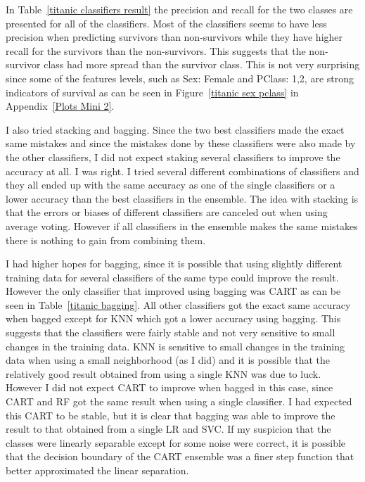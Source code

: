 \documentclass[11pt,twoside,swedish]{article}
\begin{document}
In Table~\ref{titanic classifiers result} the precision and recall for
the two classes are presented for all of the classifiers. Most of the
classifiers seems to have less precision when predicting survivors
than non-survivors while they have higher recall for the survivors
than the non-survivors. This suggests that the non-survivor class had
more spread than the survivor class. This is not very surprising since
some of the features levels, such as Sex: Female and PClass: 1,2, are
strong indicators of survival as can be seen in Figure~\ref{titanic
  sex pclass} in Appendix~\ref{Plots Mini 2}. 

I also tried stacking and bagging. Since the two best classifiers made
the exact same mistakes and since the mistakes done by these
classifiers were also made by the other classifiers, I did not expect
staking several classifiers to improve the accuracy at all. I was
right. I tried several different combinations of classifiers and they
all ended up with the same accuracy as one of the single classifiers
or a lower accuracy than the best classifiers in the
ensemble. The idea with stacking is that the errors or biases of
different classifiers are canceled out when using average
voting. However if all classifiers in the ensemble makes the same
mistakes there is nothing to gain from combining them.

I had higher hopes for bagging, since it is possible that using
slightly different training data for several classifiers of the same
type could improve the result. However the only classifier that
improved using bagging was CART as can be seen in Table~\ref{titanic
  bagging}. All other classifiers got the exact same accuracy when
bagged except for KNN which got a lower accuracy using bagging. This
suggests that the classifiers were fairly stable and not very
sensitive to small changes in the training data. KNN is sensitive to
small changes in the training data when using a small neighborhood (as
I did) and it is possible that the relatively good result obtained
from using a single KNN was due to luck. However I did not expect CART
to improve when bagged in this case, since CART and RF got the same
result when using a single classifier. I had expected this CART to be
stable, but it is clear that bagging was able to improve the result to
that obtained from a single LR and SVC. If my suspicion that the
classes were linearly separable except for some noise were correct, it is possible
that the decision boundary of the CART ensemble was a finer step
function that better approximated the linear separation.
\end{document}
